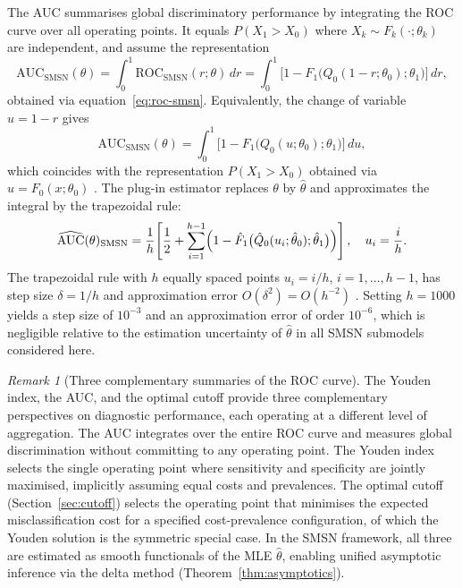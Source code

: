 \documentclass[11pt,a4paper]{article}
\theoremstyle{definition}
\theoremstyle{remark}
\newtheorem{remark}[theorem]{Remark}
\newcommand{\1}{\mathbf{1}}
\begin{document}
The AUC summarises global discriminatory performance by
integrating the ROC curve over all operating points.
It equals $P(X_1 > X_0)$ where
$X_k \sim F_k(\cdot;\theta_k)$ are independent, and assume the representation
\begin{equation*}
\label{eq:auc-smsn}
\mathrm{AUC}_{\mathrm{SMSN}}(\theta)
= \int_0^1 \mathrm{ROC}_{\mathrm{SMSN}}(r;\theta)\,dr
= \int_0^1
  \bigl[1 - F_1\bigl(Q_0(1-r;\theta_0);\theta_1\bigr)\bigr]\,dr,
\end{equation*}
obtained via equation~\eqref{eq:roc-smsn}.
Equivalently, the change of variable $u = 1-r$ gives
\[
\mathrm{AUC}_{\mathrm{SMSN}}(\theta)
= \int_0^1
  \bigl[1 - F_1\bigl(Q_0(u;\theta_0);\theta_1\bigr)\bigr]\,du,
\]
which coincides with the representation $P(X_1 > X_0)$
obtained via $u = F_0(x;\theta_0)$ \citep{bamber1975area}.
The plug-in estimator replaces $\theta$ by $\hat\theta$ and
approximates the integral by the trapezoidal rule:
\begin{equation*}
\label{eq:auc-numerical}
\widehat{\mathrm{AUC}}(\theta)_{\mathrm{SMSN}}
= \frac{1}{h}\!\left[
    \frac{1}{2}
    + \sum_{i=1}^{h-1}
      \Bigl(1 - \hat F_1\bigl(
        \hat Q_0(u_i;\hat\theta_0);\hat\theta_1
      \bigr)\Bigr)
  \right],
\quad u_i = \frac{i}{h}.
\end{equation*}
\noindent
The trapezoidal rule with $h$ equally spaced points $u_i = i/h$,
$i = 1,\ldots,h-1$, has step size $\delta = 1/h$ and approximation
error $O(\delta^2) = O(h^{-2})$ \cite{davis1984methods}.
Setting $h = 1000$ yields a step size of $10^{-3}$ and an approximation
error of order $10^{-6}$, which is negligible relative to the estimation
uncertainty of $\hat{\theta}$ in all SMSN submodels considered here.

\begin{remark}[Three complementary summaries of the ROC curve]
\label{rem:three-summaries}
\normalfont
The Youden index, the AUC, and the optimal cutoff provide
three complementary perspectives on diagnostic performance,
each operating at a different level of aggregation.
The AUC integrates over the entire ROC curve and measures
global discrimination without committing to any operating
point.
The Youden index selects the single operating point where
sensitivity and specificity are jointly maximised, implicitly
assuming equal costs and prevalences.
The optimal cutoff (Section~\ref{sec:cutoff}) selects the
operating point that minimises the expected misclassification
cost for a specified cost-prevalence configuration, of which
the Youden solution is the symmetric special case.
In the SMSN framework, all three are estimated as smooth
functionals of the MLE $\hat\theta$, enabling unified
asymptotic inference via the delta method
(Theorem~\ref{thm:asymptotics}).
\end{remark}
\end{document}
